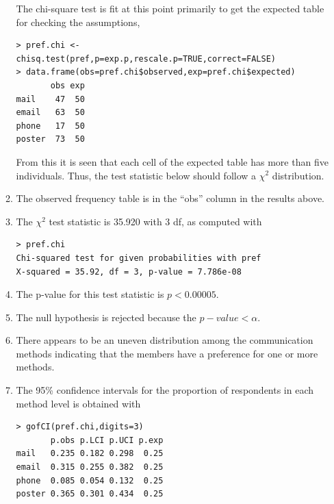 \documentclass[10pt,openany]{book}\usepackage[]{graphicx}\usepackage[]{color}
\makeatletter
\newenvironment{kframe}{%
 \def\at@end@of@kframe{}%
 \ifinner\ifhmode%
  \def\at@end@of@kframe{\end{minipage}}%
  \begin{minipage}{\columnwidth}%
 \fi\fi%
 \def\FrameCommand##1{\hskip\@totalleftmargin \hskip-\fboxsep
 \colorbox{shadecolor}{##1}\hskip-\fboxsep
     \hskip-\linewidth \hskip-\@totalleftmargin \hskip\columnwidth}%
 \MakeFramed {\advance\hsize-\width
   \@totalleftmargin\z@ \linewidth\hsize
   \@setminipage}}%
 {\par\unskip\endMakeFramed%
 \at@end@of@kframe}
\newenvironment{knitrout}{}{} %
\makeatother
\begin{document}
\begin{itemize}
\begin{enumerate}
The chi-square test is fit at this point primarily to get the expected table for checking the assumptions,
\begin{knitrout}
\color{fgcolor}\begin{kframe}
\begin{verbatim}
> pref.chi <- chisq.test(pref,p=exp.p,rescale.p=TRUE,correct=FALSE)
> data.frame(obs=pref.chi$observed,exp=pref.chi$expected)
       obs exp
mail    47  50
email   63  50
phone   17  50
poster  73  50
\end{verbatim}
\end{kframe}
\end{knitrout}
From this it is seen that each cell of the expected table has more than five individuals.  Thus, the test statistic below should follow a $\chi^{2}$ distribution.
      \item The observed frequency table is in the ``obs'' column in the results above.
      \item The $\chi^{2}$ test statistic is 35.920 with 3 df, as computed with
\begin{knitrout}
\color{fgcolor}\begin{kframe}
\begin{verbatim}
> pref.chi
Chi-squared test for given probabilities with pref 
X-squared = 35.92, df = 3, p-value = 7.786e-08
\end{verbatim}
\end{kframe}
\end{knitrout}
      \item The p-value for this test statistic is $p<0.00005$.
      \item The null hypothesis is rejected because the $p-value<\alpha$.
      \item There appears to be an uneven distribution among the communication methods indicating that the members have a preference for one or more methods.
      \item The 95\% confidence intervals for the proportion of respondents in each method level is obtained with
\begin{knitrout}
\color{fgcolor}\begin{kframe}
\begin{verbatim}
> gofCI(pref.chi,digits=3)
       p.obs p.LCI p.UCI p.exp
mail   0.235 0.182 0.298  0.25
email  0.315 0.255 0.382  0.25
phone  0.085 0.054 0.132  0.25
poster 0.365 0.301 0.434  0.25

\end{verbatim}
\end{kframe}
\end{knitrout}
\end{enumerate}
\end{itemize}
\end{document}
